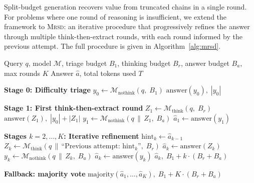 Split-budget generation recovers value from truncated chains in a single
round.
For problems where one round of reasoning is insufficient, we extend the
framework to \textsc{Mrsd}: an iterative procedure that progressively
refines the answer through multiple think-then-extract rounds, with
each round informed by the previous attempt.
The full procedure is given in Algorithm~\ref{alg:mrsd}.

\begin{algorithm}[t]
\caption{\textsc{Mrsd}: Multi-Round Self-Distillation}
\label{alg:mrsd}
\begin{algorithmic}[1]
\Require Query $q$, model $\mathcal{M}$,
  triage budget $B_1$, thinking budget $B_r$,
  answer budget $B_a$, max rounds $K$
\Ensure Answer $\hat{a}$, total tokens used $T$

\medskip
\Statex \textbf{Stage 0: Difficulty triage}
\State $y_0 \leftarrow \mathcal{M}_{\mathrm{nothink}}(q,\; B_1)$
  \State \Return $\mathrm{answer}(y_0),\; |y_0|$
\EndIf

\medskip
\Statex \textbf{Stage 1: First think-then-extract round}
\State $Z_1 \leftarrow \mathcal{M}_{\mathrm{think}}(q,\; B_r)$
  \State \Return $\mathrm{answer}(Z_1),\; |y_0| + |Z_1|$
\EndIf
\State $y_1 \leftarrow \mathcal{M}_{\mathrm{nothink}}(q \,\|\, Z_1,\; B_a)$
\State $\hat{a}_1 \leftarrow \mathrm{answer}(y_1)$

\medskip
\Statex \textbf{Stages $k = 2, \ldots, K$: Iterative refinement}
  \State $\mathrm{hint}_k \leftarrow \hat{a}_{k-1}$
  \State $Z_k \leftarrow \mathcal{M}_{\mathrm{think}}(
    q \,\|\, \text{``Previous attempt: } \mathrm{hint}_k \text{''},\; B_r)$
    \State $\hat{a}_k \leftarrow \mathrm{answer}(Z_k)$
  \Else
    \State $y_k \leftarrow \mathcal{M}_{\mathrm{nothink}}(q \,\|\, Z_k,\; B_a)$
    \State $\hat{a}_k \leftarrow \mathrm{answer}(y_k)$
  \EndIf
    \State \Return $\hat{a}_k, \; B_1 + k \cdot (B_r + B_a)$
  \EndIf
\EndFor

\medskip
\Statex \textbf{Fallback: majority vote}
\State \Return $\mathrm{majority}(\hat{a}_1, \ldots, \hat{a}_K),
  \; B_1 + K \cdot (B_r + B_a)$
\end{algorithmic}
\end{algorithm}

